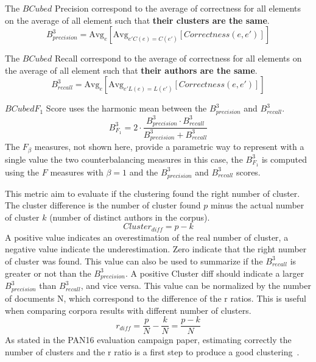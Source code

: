 \begin{definition}
  The $BCubed$ Precision correspond to the average of correctness for all elements on the average of all element such that \textbf{their clusters are the same}.
  \begin{equation}
    B^3_{precision} = \text{Avg}_{e}[\text{Avg}_{e' C(e)=C(e')}[Correctness(e, e')]]
  \end{equation}
\end{definition}

\begin{definition}
  The $BCubed$ Recall correspond to the average of correctness for all elements on the average of all element such that \textbf{their authors are the same}.
  \begin{equation}
    B^3_{recall} = \text{Avg}_{e}[\text{Avg}_{e' L(e)=L(e')}[Correctness(e, e')]]
  \end{equation}
\end{definition}

\begin{definition}
  $BCubed F_1$ Score uses the harmonic mean between the $B^3_{precision}$ and $B^3_{recall}$.
  \begin{equation}
    B^3_{F_1} =
    2 \cdot \frac{B^3_{precision} \cdot B^3_{recall}}
    {B^3_{precision} + B^3_{recall}}
  \end{equation}
  The $F_\beta$ measures, not shown here, provide a parametric way to represent with a single value the two counterbalancing measures in this case, the $B^3_{F_1}$ is computed using the $F$ measures with $\beta = 1$ and the $B^3_{precision}$ and $B^3_{recall}$ scores.
\end{definition}

\begin{definition}
  This metric aim to evaluate if the clustering found the right number of cluster.
  The cluster difference is the number of cluster found $p$ minus the actual number of cluster $k$ (number of distinct authors in the corpus).
  \begin{equation}
    Cluster_{diff} = p - k
  \end{equation}
  A positive value indicates an overestimation of the real number of cluster, a negative value indicate the underestimation.
  Zero indicate that the right number of cluster was found.
  This value can also be used to summarize if the $B^3_{recall}$ is greater or not than the $B^3_{precision}$.
  A positive Cluster diff should indicate a larger $B^3_{precision}$ than $B^3_{recall}$, and vice versa.
  This value can be normalized by the number of documents N, which correspond to the difference of the r ratios.
  This is useful when comparing corpora results with different number of clusters.
  \begin{equation}
    r_{diff} = \frac{p}{N} - \frac{k}{N} = \frac{p - k}{N}
  \end{equation}
  As stated in the PAN16 evaluation campaign paper, estimating correctly the number of clusters and the r ratio is a first step to produce a good clustering~\cite{pan16}.
\end{definition}
